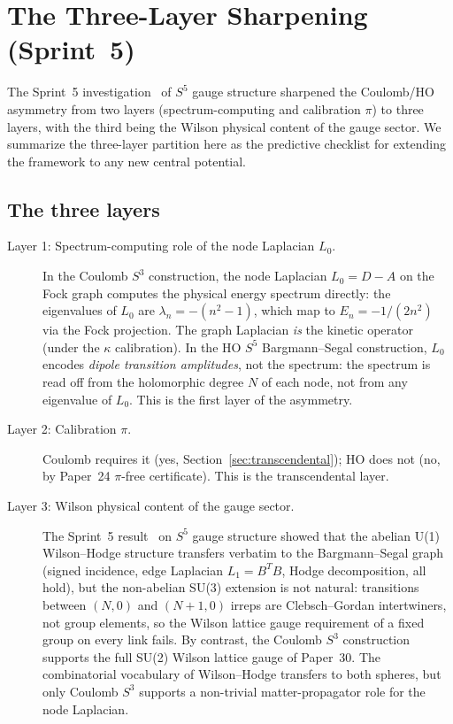 \documentclass[twocolumn,pra,amsmath,amssymb,superscriptaddress]{revtex4-2}
\begin{document}
\section{The Three-Layer Sharpening (Sprint~5)}
\label{sec:three-layers}

The Sprint~5 investigation~\cite{paper25} of $S^5$ gauge structure
sharpened the Coulomb/HO asymmetry from two layers
(spectrum-computing and calibration $\pi$) to three layers, with the
third being the Wilson physical content of the gauge sector.  We
summarize the three-layer partition here as the predictive
checklist for extending the framework to any new central potential.

\subsection{The three layers}

\begin{description}
\item[Layer 1: Spectrum-computing role of the node Laplacian $L_0$.]
  In the Coulomb $S^3$ construction, the node Laplacian $L_0 = D - A$
  on the Fock graph computes the physical energy spectrum directly:
  the eigenvalues of $L_0$ are $\lambda_n = -(n^2 - 1)$, which map
  to $E_n = -1/(2n^2)$ via the Fock projection.  The graph
  Laplacian \emph{is} the kinetic operator (under the $\kappa$
  calibration).  In the HO $S^5$ Bargmann--Segal construction, $L_0$
  encodes \emph{dipole transition amplitudes}, not the spectrum: the
  spectrum is read off from the holomorphic degree $N$ of each
  node, not from any eigenvalue of $L_0$.  This is the first layer
  of the asymmetry.
\item[Layer 2: Calibration $\pi$.]  Coulomb requires it (yes,
  Section~\ref{sec:transcendental}); HO does not (no, by Paper~24
  $\pi$-free certificate).  This is the transcendental layer.
\item[Layer 3: Wilson physical content of the gauge sector.]  The
  Sprint~5 result~\cite{paper25} on $S^5$ gauge structure showed
  that the abelian U(1) Wilson--Hodge structure transfers verbatim
  to the Bargmann--Segal graph (signed incidence, edge Laplacian
  $L_1 = B^T B$, Hodge decomposition, all hold), but the
  non-abelian SU(3) extension is not natural: transitions between
  $(N, 0)$ and $(N+1, 0)$ irreps are Clebsch--Gordan intertwiners,
  not group elements, so the Wilson lattice gauge requirement of a
  fixed group on every link fails.  By contrast, the Coulomb $S^3$
  construction supports the full SU(2) Wilson lattice gauge of
  Paper~30.  The combinatorial vocabulary of Wilson--Hodge transfers
  to both spheres, but only Coulomb $S^3$ supports a non-trivial
  matter-propagator role for the node Laplacian.
\end{description}
\end{document}
